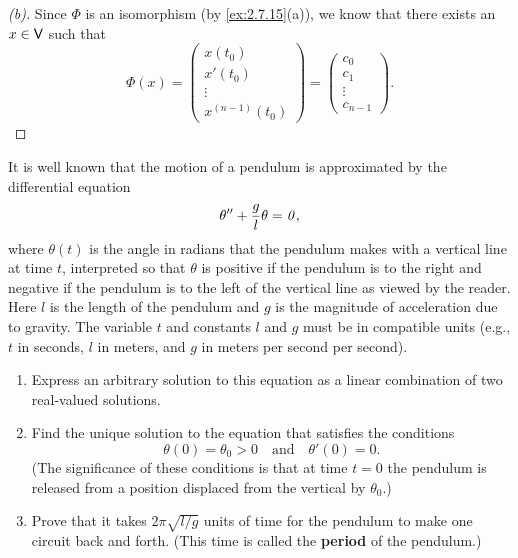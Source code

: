 \begin{proof}[(b)]
  Since \(\Phi\) is an isomorphism (by \cref{ex:2.7.15}(a)), we know that there exists an \(x \in \mathsf{V}\) such that
  \[
    \Phi(x) = \begin{pmatrix}
      x(t_0)  \\
      x'(t_0) \\
      \vdots  \\
      x^{(n - 1)}(t_0)
    \end{pmatrix} = \begin{pmatrix}
      c_0    \\
      c_1    \\
      \vdots \\
      c_{n - 1}
    \end{pmatrix}.
  \]
\end{proof}

\begin{ex}\label{ex:2.7.16}
  It is well known that the motion of a pendulum is approximated by the differential equation
  \[
    \theta'' + \frac{g}{l} \theta = \mathit{0},
  \]
  where \(\theta(t)\) is the angle in radians that the pendulum makes with a vertical line at time \(t\), interpreted so that \(\theta\) is positive if the pendulum is to the right and negative if the pendulum is to the left of the vertical line as viewed by the reader.
  Here \(l\) is the length of the pendulum and \(g\) is the magnitude of acceleration due to gravity.
  The variable \(t\) and constants \(l\) and \(g\) must be in compatible units
  (e.g., \(t\) in seconds, \(l\) in meters, and \(g\) in meters per second per second).
  \begin{enumerate}
    \item Express an arbitrary solution to this equation as a linear combination of two real-valued solutions.
    \item Find the unique solution to the equation that satisfies the conditions
          \[
            \theta(0) = \theta_0 > 0 \quad \text{and} \quad \theta'(0) = 0.
          \]
          (The significance of these conditions is that at time \(t = 0\) the pendulum is released from a position displaced from the vertical by \(\theta_0\).)
    \item Prove that it takes \(2 \pi \sqrt{l / g}\) units of time for the pendulum to make one circuit back and forth.
          (This time is called the \textbf{period} of the pendulum.)
  \end{enumerate}
\end{ex}

